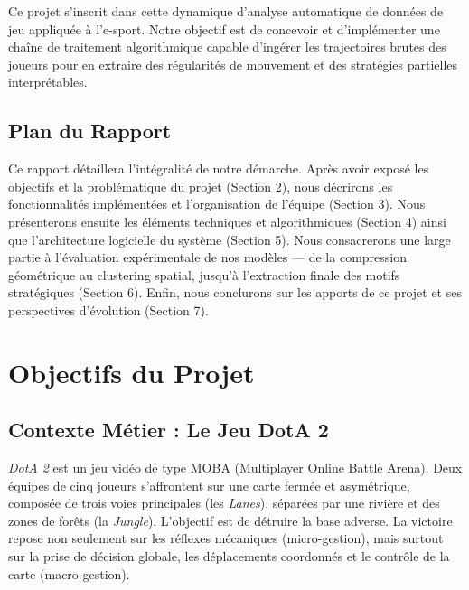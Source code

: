 \documentclass[11pt, a4paper]{article}
\begin{document}
Ce projet s'inscrit dans cette dynamique d'analyse automatique de données de jeu appliquée à l'e-sport. Notre objectif est de concevoir et d'implémenter une chaîne de traitement algorithmique capable d'ingérer les trajectoires brutes des joueurs pour en extraire des régularités de mouvement et des stratégies partielles interprétables. 

\subsection{Plan du Rapport}

Ce rapport détaillera l'intégralité de notre démarche. Après avoir exposé les objectifs et la problématique du projet (Section 2), nous décrirons les fonctionnalités implémentées et l'organisation de l'équipe (Section 3). Nous présenterons ensuite les éléments techniques et algorithmiques (Section 4) ainsi que l'architecture logicielle du système (Section 5). Nous consacrerons une large partie à l'évaluation expérimentale de nos modèles --- de la compression géométrique au clustering spatial, jusqu'à l'extraction finale des motifs stratégiques (Section 6). Enfin, nous conclurons sur les apports de ce projet et ses perspectives d'évolution (Section 7).

\section{Objectifs du Projet}

\subsection{Contexte Métier : Le Jeu DotA 2}
\textit{DotA 2} est un jeu vidéo de type MOBA (Multiplayer Online Battle Arena). Deux équipes de cinq joueurs s'affrontent sur une carte fermée et asymétrique, composée de trois voies principales (les \textit{Lanes}), séparées par une rivière et des zones de forêts (la \textit{Jungle}). L'objectif est de détruire la base adverse. La victoire repose non seulement sur les réflexes mécaniques (micro-gestion), mais surtout sur la prise de décision globale, les déplacements coordonnés et le contrôle de la carte (macro-gestion).
\end{document}
